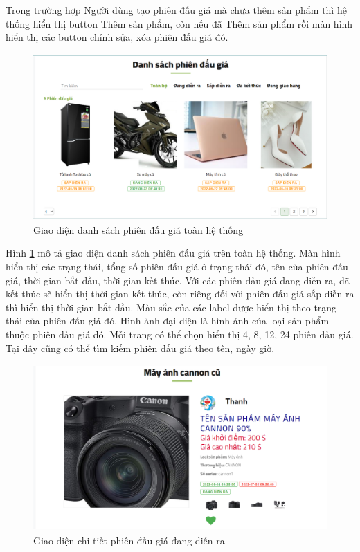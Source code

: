 \documentclass[../DoAn.tex]{subfiles}
\begin{document}
Trong trường hợp Người dùng tạo phiên đấu giá mà chưa thêm sản phẩm thì hệ thống hiển thị button Thêm sản phẩm, còn nếu đã Thêm sản phẩm rồi màn hình hiển thị các button chỉnh sửa, xóa phiên đấu giá đó. 
\begin{figure}[H]
    \centering
    \includegraphics[width=11.4cm,height=6.36cm]{Hinhve/listauctions.png}
    \caption{Giao diện danh sách phiên đấu giá toàn hệ thống}
    \label{fig:Fig417}
\end{figure}
Hình \ref{fig:Fig417} mô tả giao diện danh sách phiên đấu giá trên toàn hệ thống. Màn hình hiển thị các trạng thái, tổng số phiên đấu giá ở trạng thái đó, tên của phiên đấu giá, thời gian bắt đầu, thời gian kết thúc. Với các phiên đấu giá đang diễn ra, đã kết thúc sẽ hiển thị thời gian kết thúc, còn riêng đối với phiên đấu giá sắp diễn ra thì hiển thị thời gian bắt đầu. Màu sắc của các label được hiển thị theo trạng thái của phiên đấu giá đó. Hình ảnh đại diện là hình ảnh của loại sản phẩm thuộc phiên đấu giá đó. Mỗi trang có thể chọn hiển thị 4, 8, 12, 24 phiên đấu giá. Tại đây cũng có thể tìm kiếm phiên đấu giá theo tên, ngày giờ. 
\begin{figure}[H]
    \centering
    \includegraphics[width=11.4cm,height=6.36cm]{Hinhve/auctionactive.png}
    \caption{Giao diện chi tiết phiên đấu giá đang diễn ra}
    \label{fig:Fig418}
\end{figure}
\end{document}

